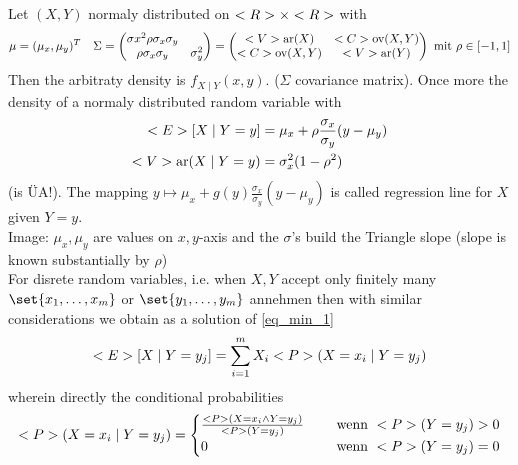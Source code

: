 \begin{*example}
	Let $(X,Y)$ normaly distributed on $\R\times \R$ with
	\begin{align*}
		\mu = (\mu_x, \mu_y)^T \quad \Sigma = \begin{pmatrix}
			\sigma x^2 \rho\sigma_x \sigma_y\\
			\rho \sigma_x \sigma_y & \sigma_y^2
		\end{pmatrix} = \begin{pmatrix}
			\Var(X) & \Cov(X,Y)\\
			\Cov(X,Y) & \Var(Y)
		\end{pmatrix} \mit \rho \in [-1,1]
	\end{align*}
	Then the arbitraty density is $f_{X\mid Y}(x,y)$. ($\Sigma$ covariance matrix). Once more the density of a normaly distributed random variable with 
	\begin{align*}
		\E[X \mid Y=y] &= \mu_x + \rho \frac{\sigma_x}{\sigma_y}(y-\mu_y)\\
		\Var(X\mid Y=y) &= \sigma_x^2(1-\rho^2)
	\end{align*}
	(is ÜA!). The mapping $y \mapsto \mu_x + g(y)\frac{\sigma_x}{\sigma_y}(y-\mu_y)$ is called regression line for $X$ given $Y=y$.\\
	Image: $\mu_x,\mu_y$ are values on $x,y$-axis and the $\sigma$'s build the Triangle slope (slope is known substantially by $\rho$)\\
	For disrete random variables, i.e. when $X,Y$ accept only finitely many $\set{x_1,\dots,x_m}$ or $\set{y_1,\dots,y_m}$ annehmen then with similar considerations we obtain as a solution of \eqref{eq_min_1}
	\begin{align*}
		\E[X\mid Y=y_j] = \sum_{i=1}^m X_i \P(X=x_i \mid Y=y_j)
	\end{align*}
	wherein directly the conditional probabilities
	\begin{align*}
		\P(X=x_i \mid Y=y_j) = \begin{cases}
			\frac{\P(X=x_i \wedge Y=y_j)}{\P(Y=y_j)} &\quad \text{ wenn } \P(Y=y_j) > 0\\
			0 &\quad \text{ wenn } \P(Y=y_j) = 0 
		\end{cases}
	\end{align*}
\end{*example}
